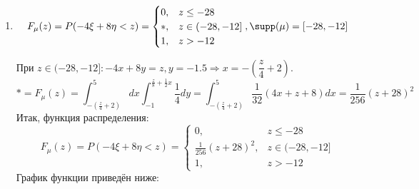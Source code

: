 \begin{enumerate}
	\item
	\[
	F_{\mu} (z) = P(-4\xi + 8 \eta < z) =
	\begin{cases}
		0, &z \le -28 \\
		*, &z \in (-28, -12] \\
		1, &z > -12
	\end{cases}, \supp (\mu) = [-28, -12]
	\]
	\begin{figure}[H]
	\end{figure}
	При $z \in (-28, -12]: -4x + 8y = z, y = -1.5 \Rightarrow x = -\left(\dfrac{z}{4}+2\right)$.
	\[ * = F_{\mu}(z) = \int_{-\left(\frac{z}{4}+2\right)}^{5} dx \int_{-1}^{\frac{z}{8} + \frac{1}{2}x} \frac{1}{4} dy = \int_{-\left(\frac{z}{4}+2\right)}^{5} \frac{1}{32} (4x + z + 8) dx = \frac{1}{256} (z + 28)^2 \]
	Итак, функция распределения:
	\[
	F_{\mu} (z) = P(-4\xi + 8 \eta < z) =
	\begin{cases}
		0, &z \le -28 \\
		\frac{1}{256} (z + 28)^2, &z \in (-28, -12] \\
		1, &z > -12
	\end{cases}
	\]
	График функции приведён ниже:
	\begin{figure}[H]

\end{figure}
\end{enumerate}
